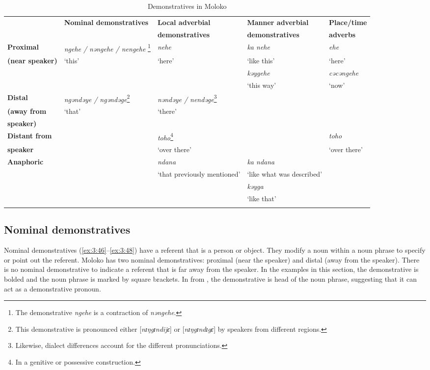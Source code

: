 \begin{sidewaystable}
\begin{tabular}{lllll} 
\lsptoprule
& \textbf{Nominal demonstratives}  & \textbf{Local adverbial}  & \textbf{Manner adverbial} & \textbf{Place/time}\\ 
& &  \textbf{demonstratives}  & \textbf{demonstratives} & \textbf{adverbs}\\
\midrule
\textbf{Proximal } & \textit{ngehe / }\textit{nəngehe / nengehe }\footnote{The demonstrative \textit{ngehe} is a contraction of \textit{nəngehe}.} & \textit{nehe} & \textit{ka nehe } & \textit{ehe} \\ 
\textbf{(near speaker)} & ‘this’  & ‘here’ & ‘like this’ & ‘here’\\
& & & \textit{kəygehe} & \textit{cəcəngehe}\\
& & & ‘this way’ & ‘now’\\
\midrule
\textbf{Distal } & \textit{ngəndəye / ngəndəge}\footnote{This demonstrative is pronounced either [\textit{nɪŋgɪndijɛ}] or [\textit{nɪŋgɪndɪgɛ}] by speakers from different regions.} & \textit{nəndəye / nendəge}\footnote{Likewise, dialect differences account for the different pronunciations.} & & \\
\textbf{(away from}  & ‘that’ & ‘there’ &  & \\
\textbf{speaker)} &  &  & &\\
\midrule
\textbf{Distant from}  &  & \textit{toho}\footnote{In a genitive or possessive construction.} &  & \textit{toho}\\
\textbf{speaker} & & ‘over there’ & & ‘over there’\\
\midrule
\textbf{Anaphoric} &  & \textit{ndana} & \textit{ka ndana } & \\
& & ‘that previously mentioned’ & ‘like what was described’ & \\
& & & \textit{kəyga} & \\
& & & ‘like that’ & \\
\lspbottomrule
\end{tabular}
\caption{\label{tab:3.20} Demonstratives in Moloko}
\end{sidewaystable}%

\subsection{Nominal demonstratives}\label{sec:3.2.1}
\hypertarget{RefHeading1210961525720847}{}
Nominal demonstratives (\ref{ex:3:46}--\ref{ex:3:48}) have a referent that is a person or object. They modify a noun within a noun phrase to specify or point out the referent. Moloko has two nominal demonstratives: proximal (near the speaker) and distal (away from the speaker). There is no nominal demonstrative to indicate a referent that is far away from the speaker. In the examples in this section, the demonstrative is bolded and the noun phrase is marked by square brackets. In  from , the demonstrative is head of the noun phrase, suggesting that it can act as a demonstrative pronoun. 

